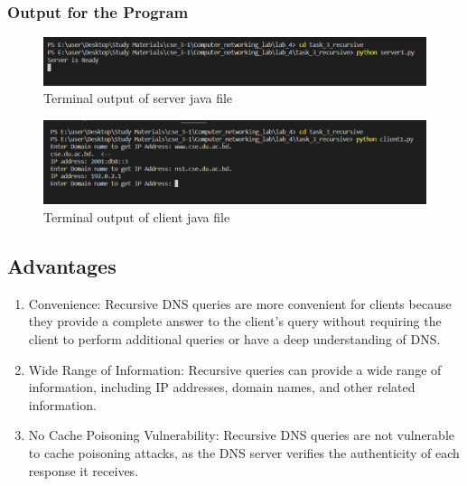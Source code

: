 \documentclass[11pt]{article}
\begin{document}
\subsubsection{Output for the Program}

  \begin{figure}[!h]
\centering
\includegraphics[width=\textwidth]{server2.png}
\caption{Terminal output of server java file }
\end{figure}

 \begin{figure}[!h]
\centering
\includegraphics[width=\textwidth]{client3.png}
\caption{Terminal output of client java file }
\end{figure}
\FloatBarrier 


\subsection{Advantages}
\begin{enumerate}
\item Convenience: Recursive DNS queries are more convenient for clients because they provide a complete answer to the client’s query without requiring the client to perform additional queries or have a deep understanding of DNS.
\item Wide Range of Information: Recursive queries can provide a wide range of information, including IP addresses, domain names, and other related information.
\item No Cache Poisoning Vulnerability: Recursive DNS queries are not vulnerable to cache poisoning attacks, as the DNS server verifies the authenticity of each response it receives.
\end{enumerate}
\end{document}

